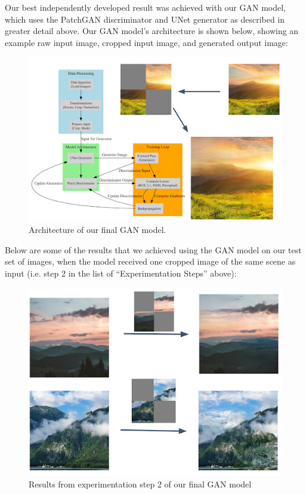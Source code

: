 \documentclass[sigconf]{acmart}
\begin{document}
Our best independently developed result was achieved with our GAN model, which uses the PatchGAN discriminator and UNet generator as described in greater detail above. Our GAN model’s architecture is shown below, showing an example raw input image, cropped input image, and generated output image:

\begin{figure}[h!]
    \centering
    \includegraphics[width=\linewidth]{gan_architecture}
    \caption{Architecture of our final GAN model.}
    \label{fig:gan_architecture}
\end{figure}

Below are some of the results that we achieved using the GAN model on our test set of images, when the model received one cropped image of the same scene as input (i.e. step 2 in the list of “Experimentation Steps” above):

\begin{figure}[h!]
    \centering
    \includegraphics[width=\linewidth]{gan_step_2}
    \caption{Results from experimentation step 2 of our final GAN model}
    \label{fig:gan_step_2}
\end{figure}
\end{document}
